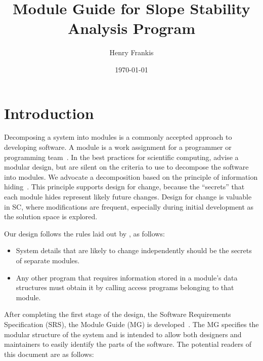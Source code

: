 \documentclass[12pt]{article}
\begin{document}
\title{Module Guide for Slope Stability Analysis
Program} 
\author{Henry Frankis}
\date{\today}
	
\maketitle

\tableofcontents

\newpage

\section{Introduction}

\hspace{3ex}Decomposing a system into modules is a commonly accepted
approach to developing software.  A module is a work assignment for a
programmer or programming team~\citep{ParnasEtAl1984}.  In the best
practices for scientific computing, \citet{WilsonEtAl2013} advise a
modular design, but are silent on the criteria to use to decompose the
software into modules.  We advocate a decomposition based on the
principle of information hiding~\citep{Parnas1972a}.  This principle
supports design for change, because the ``secrets'' that each module
hides represent likely future changes.  Design for change is valuable
in SC, where modifications are frequent, especially during initial
development as the solution space is explored.

Our design follows the rules laid out by \citet{ParnasEtAl1984}, as follows:
\begin{itemize}  
\item System details that are likely to change independently should be
  the secrets of separate modules.
\item Any other program that requires information stored in a module's
  data structures must obtain it by calling access programs belonging
  to that module.
\end{itemize}

After completing the first stage of the design, the Software
Requirements Specification (SRS), the Module Guide (MG) is
developed~\citep{ParnasEtAl1984}. The MG specifies the modular
structure of the system and is intended to allow both designers and
maintainers to easily identify the parts of the software.  The
potential readers of this document are as follows:
\end{document}
